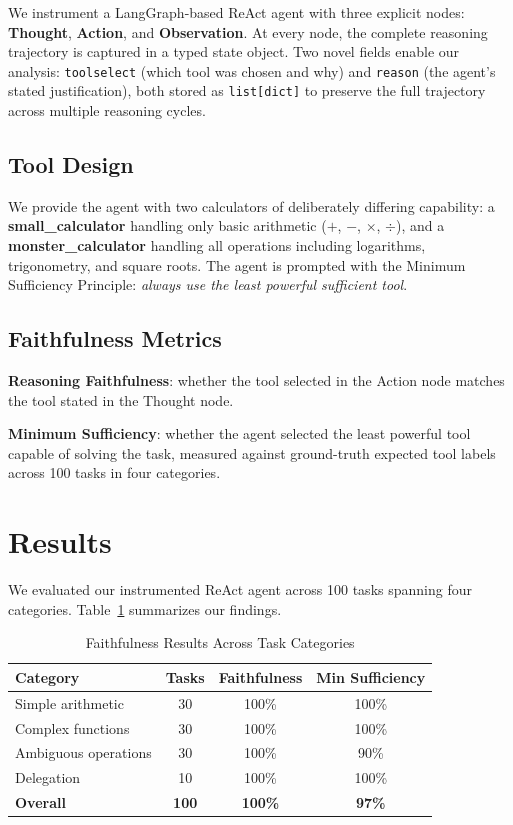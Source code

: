 \documentclass{article}
\begin{document}
We instrument a LangGraph-based ReAct agent with three explicit nodes: \textbf{Thought}, \textbf{Action}, and \textbf{Observation}. At every node, the complete reasoning trajectory is captured in a typed state object. Two novel fields enable our analysis: \texttt{toolselect} (which tool was chosen and why) and \texttt{reason} (the agent's stated justification), both stored as \texttt{list[dict]} to preserve the full trajectory across multiple reasoning cycles.

\subsection{Tool Design}

We provide the agent with two calculators of deliberately differing capability: a \textbf{small\_calculator} handling only basic arithmetic ($+$, $-$, $\times$, $\div$), and a \textbf{monster\_calculator} handling all operations including logarithms, trigonometry, and square roots. The agent is prompted with the Minimum Sufficiency Principle: \textit{always use the least powerful sufficient tool}.

\subsection{Faithfulness Metrics}

\textbf{Reasoning Faithfulness}: whether the tool selected in the Action node matches the tool stated in the Thought node.

\textbf{Minimum Sufficiency}: whether the agent selected the least powerful tool capable of solving the task, measured against ground-truth expected tool labels across 100 tasks in four categories.

\section{Results}

We evaluated our instrumented ReAct agent across 100 tasks spanning four categories. Table~\ref{tab:results} summarizes our findings.

\begin{table}[h]
\centering
\caption{Faithfulness Results Across Task Categories}
\label{tab:results}
\begin{tabular}{lccc}
\toprule
\textbf{Category} & \textbf{Tasks} & \textbf{Faithfulness} & \textbf{Min Sufficiency} \\
\midrule
Simple arithmetic    & 30  & 100\% & 100\% \\
Complex functions    & 30  & 100\% & 100\% \\
Ambiguous operations & 30  & 100\% & 90\%  \\
Delegation           & 10  & 100\% & 100\% \\
\midrule
\textbf{Overall}     & \textbf{100} & \textbf{100\%} & \textbf{97\%} \\
\bottomrule
\end{tabular}
\end{table}
\end{document}
